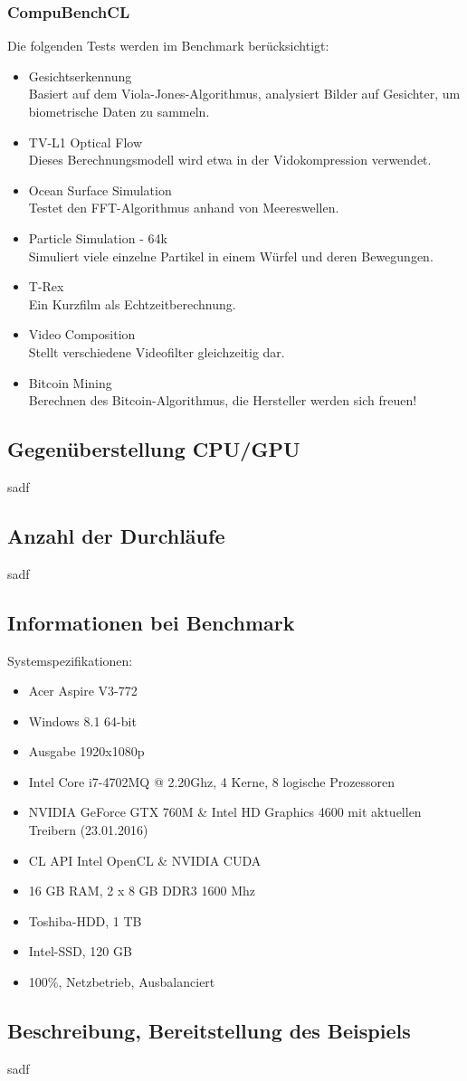 \documentclass[letterpaper, 12pt]{article}
\let\tempsubsection\subsection
\renewcommand\subsection[1]{\vspace{0cm}\tempsubsection{#1}\vspace{0cm}}
\let\tempsubsubsection\subsubsection
\renewcommand\subsubsection[1]{\vspace{0cm}\tempsubsubsection{#1}\vspace{0cm}}
\begin{document}
\subsubsection{CompuBenchCL}
Die folgenden Tests werden im Benchmark berücksichtigt:
\begin{itemize}
	\item Gesichtserkennung \\
	Basiert auf dem Viola-Jones-Algorithmus, analysiert Bilder auf Gesichter, um biometrische Daten zu sammeln.
	\item  TV-L1 Optical Flow \\
	Dieses Berechnungsmodell wird etwa in der Vidokompression verwendet.
	\item Ocean Surface Simulation \\
	Testet den FFT-Algorithmus anhand von Meereswellen.
	\item Particle Simulation - 64k \\
	Simuliert viele einzelne Partikel in einem Würfel und deren Bewegungen.
	\item T-Rex \\
	Ein Kurzfilm als Echtzeitberechnung.
	\item Video Composition \\
	Stellt verschiedene Videofilter gleichzeitig dar.
	\item Bitcoin Mining \\
	Berechnen des Bitcoin-Algorithmus, die Hersteller werden sich freuen!
\end{itemize}

\newpage

\subsection{Gegenüberstellung CPU/GPU}
sadf
\subsection{Anzahl der Durchläufe}
sadf
\subsection{Informationen bei Benchmark}
Systemspezifikationen:
\begin{itemize}
	\item Acer Aspire V3-772
	\item Windows 8.1 64-bit
	\item Ausgabe 1920x1080p
	\item Intel Core i7-4702MQ @ 2.20Ghz, 4 Kerne, 8 logische Prozessoren
	\item NVIDIA GeForce GTX 760M \& Intel HD Graphics 4600 mit aktuellen Treibern (23.01.2016)
	\item CL API Intel OpenCL \& NVIDIA CUDA
	\item 16 GB RAM, 2 x 8 GB DDR3 1600 Mhz
	\item Toshiba-HDD, 1 TB
	\item Intel-SSD, 120 GB
	\item 100\%, Netzbetrieb, Ausbalanciert
\end{itemize}
\subsection{Beschreibung, Bereitstellung des Beispiels}
sadf

\newpage



\lstlistoflistings
\listoffigures
\end{document}
